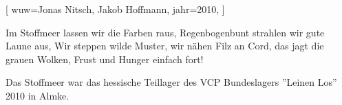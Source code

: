 [
    wuw={Jonas Nitsch, Jakob Hoffmann}, 
    jahr={2010},
]

\beginchorus
Im Stoffmeer lassen wir die Farben raus,
Regenbogenbunt strahlen wir gute Laune aus,
Wir steppen wilde Muster, wir nähen Filz an Cord,
das jagt die grauen Wolken, Frust und Hunger einfach fort!
\endchorus

\endsong

\beginscripture{}
Das Stoffmeer war das hessische Teillager des VCP Bundeslagers ''Leinen Los'' 2010 in Almke.
\endscripture
